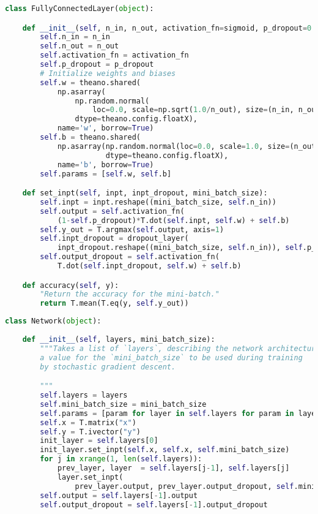 \begin{lstlisting}[language=Python]
class FullyConnectedLayer(object):

    def __init__(self, n_in, n_out, activation_fn=sigmoid, p_dropout=0.0):
        self.n_in = n_in
        self.n_out = n_out
        self.activation_fn = activation_fn
        self.p_dropout = p_dropout
        # Initialize weights and biases
        self.w = theano.shared(
            np.asarray(
                np.random.normal(
                    loc=0.0, scale=np.sqrt(1.0/n_out), size=(n_in, n_out)),
                dtype=theano.config.floatX),
            name='w', borrow=True)
        self.b = theano.shared(
            np.asarray(np.random.normal(loc=0.0, scale=1.0, size=(n_out,)),
                       dtype=theano.config.floatX),
            name='b', borrow=True)
        self.params = [self.w, self.b]

    def set_inpt(self, inpt, inpt_dropout, mini_batch_size):
        self.inpt = inpt.reshape((mini_batch_size, self.n_in))
        self.output = self.activation_fn(
            (1-self.p_dropout)*T.dot(self.inpt, self.w) + self.b)
        self.y_out = T.argmax(self.output, axis=1)
        self.inpt_dropout = dropout_layer(
            inpt_dropout.reshape((mini_batch_size, self.n_in)), self.p_dropout)
        self.output_dropout = self.activation_fn(
            T.dot(self.inpt_dropout, self.w) + self.b)

    def accuracy(self, y):
        "Return the accuracy for the mini-batch."
        return T.mean(T.eq(y, self.y_out))
\end{lstlisting}

\begin{lstlisting}[language=Python]
class Network(object):
    
    def __init__(self, layers, mini_batch_size):
        """Takes a list of `layers`, describing the network architecture, and
        a value for the `mini_batch_size` to be used during training
        by stochastic gradient descent.

        """
        self.layers = layers
        self.mini_batch_size = mini_batch_size
        self.params = [param for layer in self.layers for param in layer.params]
        self.x = T.matrix("x")  
        self.y = T.ivector("y")
        init_layer = self.layers[0]
        init_layer.set_inpt(self.x, self.x, self.mini_batch_size)
        for j in xrange(1, len(self.layers)):
            prev_layer, layer  = self.layers[j-1], self.layers[j]
            layer.set_inpt(
                prev_layer.output, prev_layer.output_dropout, self.mini_batch_size)
        self.output = self.layers[-1].output
        self.output_dropout = self.layers[-1].output_dropout
\end{lstlisting}

